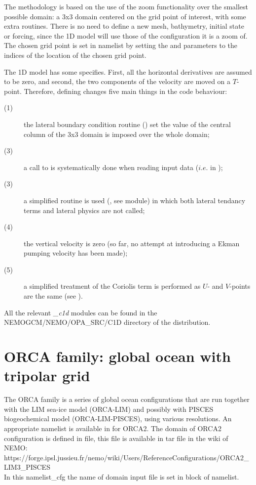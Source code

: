 \documentclass[../main/NEMO_manual]{subfiles}
\begin{document}
The methodology is based on the use of the zoom functionality over the smallest possible domain:
a 3x3 domain centered on the grid point of interest, with some extra routines.
There is no need to define a new mesh, bathymetry, initial state or forcing,
since the 1D model will use those of the configuration it is a zoom of.
The chosen grid point is set in \textit{} namelist by
setting the  and  parameters to the indices of the location of the chosen grid point.

The 1D model has some specifies. First, all the horizontal derivatives are assumed to be zero,
and second, the two components of the velocity are moved on a $T$-point. 
Therefore, defining  changes five main things in the code behaviour: 
\begin{description}
\item[(1)]
  the lateral boundary condition routine () set the value of the central column of
  the 3x3 domain is imposed over the whole domain;
\item[(3)]
  a call to  is systematically done when reading input data ($i.e.$ in );
\item[(3)]
  a simplified  routine is used (, see  module) in which
  both lateral tendancy terms and lateral physics are not called;
\item[(4)]
  the vertical velocity is zero
  (so far, no attempt at introducing a Ekman pumping velocity has been made);
\item[(5)]
  a simplified treatment of the Coriolis term is performed as $U$- and $V$-points are the same
  (see ).
\end{description}
All the relevant \textit{\_c1d} modules can be found in the NEMOGCM/NEMO/OPA\_SRC/C1D directory of
the \NEMO distribution.


\section{ORCA family: global ocean with tripolar grid}
\label{sec:CFG_orca}

The ORCA family is a series of global ocean configurations that are run together with
the LIM sea-ice model (ORCA-LIM) and possibly with PISCES biogeochemical model (ORCA-LIM-PISCES),
using various resolutions.
An appropriate namelist is available in  for ORCA2.
The domain of ORCA2 configuration is defined in  file,
this file is available in tar file in the wiki of NEMO: \\
https://forge.ipsl.jussieu.fr/nemo/wiki/Users/ReferenceConfigurations/ORCA2\_LIM3\_PISCES \\
In this namelist\_cfg the name of domain input file is set in  block of namelist. 
\end{document}
